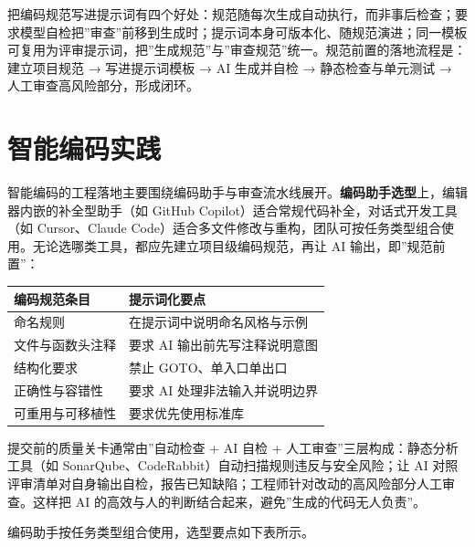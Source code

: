 \documentclass[
]{ctexbook}
\newcounter{none}
\begin{document}
把编码规范写进提示词有四个好处：规范随每次生成自动执行，而非事后检查；要求模型自检把''审查''前移到生成时；提示词本身可版本化、随规范演进；同一模板可复用为评审提示词，把''生成规范''与''审查规范''统一。规范前置的落地流程是：建立项目规范
→ 写进提示词模板 → AI 生成并自检 → 静态检查与单元测试 →
人工审查高风险部分，形成闭环。

\section{智能编码实践}\label{ux667aux80fdux7f16ux7801ux5b9eux8df5}

智能编码的工程落地主要围绕编码助手与审查流水线展开。\textbf{编码助手选型}上，编辑器内嵌的补全型助手（如
GitHub Copilot）适合常规代码补全，对话式开发工具（如 Cursor、Claude
Code）适合多文件修改与重构，团队可按任务类型组合使用。无论选哪类工具，都应先建立项目级编码规范，再让
AI 输出，即''规范前置''：

{\def\LTcaptype{none} %
\begin{longtable}[]{@{}ll@{}}
\toprule\noalign{}
编码规范条目 & 提示词化要点 \\
\midrule\noalign{}
\endhead
\bottomrule\noalign{}
\endlastfoot
命名规则 & 在提示词中说明命名风格与示例 \\
文件与函数头注释 & 要求 AI 输出前先写注释说明意图 \\
结构化要求 & 禁止 GOTO、单入口单出口 \\
正确性与容错性 & 要求 AI 处理非法输入并说明边界 \\
可重用与可移植性 & 要求优先使用标准库 \\
\end{longtable}
}

提交前的质量关卡通常由''自动检查 + AI 自检 +
人工审查''三层构成：静态分析工具（如
SonarQube、CodeRabbit）自动扫描规则违反与安全风险；让 AI
对照评审清单对自身输出自检，报告已知缺陷；工程师针对改动的高风险部分人工审查。这样把
AI 的高效与人的判断结合起来，避免''生成的代码无人负责''。

编码助手按任务类型组合使用，选型要点如下表所示。
\end{document}
